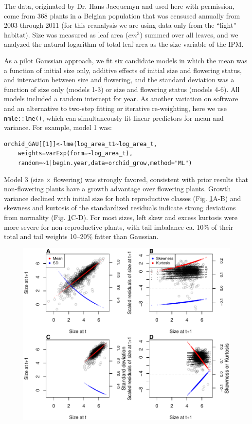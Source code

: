 \documentclass[12pt]{article}
\begin{document}
The data, originated by Dr. Hans Jacquemyn and used here with permission, come from 368 plants in a Belgian population that was censused annually from 2003 through 2011 (for this reanalysis we are using data only from the ``light'' habitat). 
Size was measured as leaf area ($cm^3$) summed over all leaves, and we analyzed the natural logarithm of total leaf area as the size variable of the IPM. 

As a pilot Gaussian approach, we fit six candidate models in which the mean was a function of initial size only, additive effects of initial size and flowering status, and interaction between size and flowering, and the standard deviation was a function of size only (models 1-3) or size and flowering status (models 4-6). 
All models included a random intercept for year. 
As another variation on software and an alternative to two-step fitting or iterative re-weighting, here we use \verb|nmle::lme()|, which can simultaneously fit linear predictors for mean and variance. 
For example, model 1 was:
\begin{lstlisting}
orchid_GAU[[1]]<-lme(log_area_t1~log_area_t,
	weights=varExp(form=~log_area_t),
	random=~1|begin.year,data=orchid_grow,method="ML")
\end{lstlisting}
Model 3 (size $\times$ flowering) was strongly favored, consistent with prior results that non-flowering plants have a growth advantage over flowering plants. 
Growth variance declined with initial size for both reproductive classes (Fig. \ref{fig:orchid_diagnostics}A-B) and skewness and kurtosis of the standardized residuals indicate strong deviations from normality (Fig. \ref{fig:orchid_diagnostics}C-D). 
For most sizes, left skew and excess kurtosis were more severe for non-reproductive plants, with tail imbalance ca. 10\% of their total and tail weights 10--20\% fatter than Gaussian. 

\begin{figure}[tbp]
	\centering
	\includegraphics[width=1.0\textwidth]{figures/orchid_diagnostics.pdf}
	\caption{}
	\label{fig:orchid_diagnostics}
\end{figure} 
\end{document}
